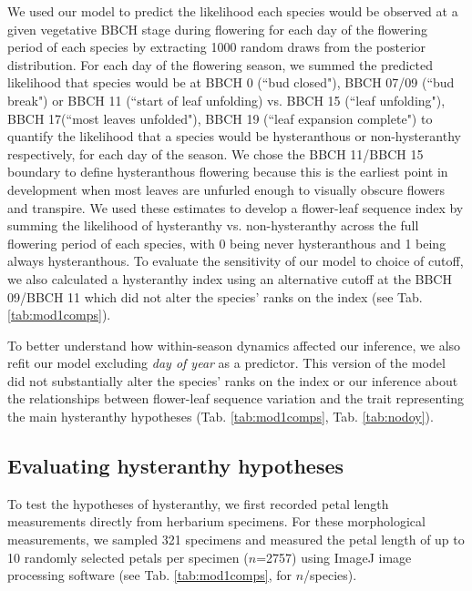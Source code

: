 \documentclass{article}[12pt]
\begin{document}
We used our model to predict the likelihood each species would be observed at a given vegetative BBCH stage during flowering for each day of the flowering period of each species by extracting 1000 random draws from the posterior distribution. For each day of the flowering season, we summed the predicted likelihood that species would be at BBCH 0  (``bud closed"), BBCH 07/09 (``bud break") or BBCH 11 (``start of leaf unfolding) vs. BBCH 15 (``leaf unfolding"), BBCH 17(``most leaves unfolded"), BBCH 19 (``leaf expansion complete") to quantify the likelihood that a species would be hysteranthous or non-hysteranthy respectively, for each day of the season. We chose the BBCH 11/BBCH 15 boundary to define hysteranthous flowering because this is the earliest point in development when most leaves are unfurled enough to visually obscure flowers and transpire. We used these estimates to develop a flower-leaf sequence index by summing the likelihood of hysteranthy vs. non-hysteranthy across the full flowering period of each species, with 0 being never hysteranthous and 1 being always hysteranthous. To evaluate the sensitivity of our model to choice of cutoff, we also calculated a hysteranthy index using an alternative cutoff at the BBCH 09/BBCH 11 which did not alter the species' ranks on the index (see Tab. \ref{tab:mod1comps}).

To better understand how within-season dynamics affected our inference, we also refit our model excluding \emph{day of year} as a predictor. This version of the model did not substantially alter the species' ranks on the index or our inference about the relationships between flower-leaf sequence variation and the trait representing the main hysteranthy hypotheses (Tab. \ref{tab:mod1comps}, Tab. \ref{tab:nodoy}).

\subsection*{Evaluating hysteranthy hypotheses}
To test the hypotheses of hysteranthy, we first recorded petal length measurements directly from herbarium specimens. For these morphological measurements, we sampled 321 specimens and measured the petal length of up to 10 randomly selected petals per specimen ($n$=2757) using ImageJ image processing software (see Tab. \ref{tab:mod1comps}, for $n$/species).%
\end{document}
